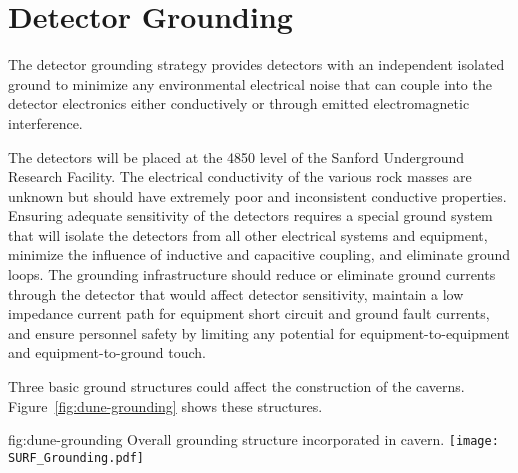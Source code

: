 \section{Detector Grounding}
\label{sec:fdsp-coord-faci-grounding}


The detector grounding strategy provides 
detectors with an independent isolated ground to minimize any
environmental electrical noise that can couple into the detector
electronics either conductively or through emitted electromagnetic
interference.


The detectors will be placed at the 4850 level of the Sanford
Underground Research Facility. The electrical conductivity of the
various rock masses are unknown but should have extremely poor
and inconsistent conductive properties. Ensuring adequate sensitivity
of the detectors requires a special ground system that
will isolate the detectors from all other electrical systems and
equipment, minimize the influence of inductive and capacitive coupling,
and eliminate ground loops. The grounding
infrastructure should reduce or eliminate ground currents
through the detector that would affect detector sensitivity, maintain
a low impedance current path for equipment short circuit and ground
fault currents, and ensure personnel safety by limiting any potential for
equipment-to-equipment and equipment-to-ground touch.


Three basic ground structures could affect the
construction of the caverns. Figure~\ref{fig:dune-grounding} shows these structures.
\begin{dunefigure}{fig:dune-grounding}
  {Overall  grounding structure incorporated in cavern.}
  \texttt{[image: SURF\_Grounding.pdf]}
\end{dunefigure}


